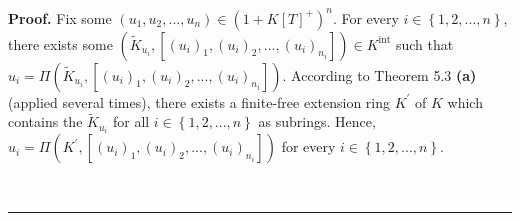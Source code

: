 \documentclass[numbers=enddot,12pt,final,onecolumn,notitlepage]{scrartcl}%
\newenvironment{proof}[1][Proof]{\noindent\textbf{#1.} }{\ \rule{0.5em}{0.5em}}
\begin{document}
\begin{proof}
Fix some $\left(  u_{1},u_{2},...,u_{n}\right)  \in\left(  1+K\left[
T\right]  ^{+}\right)  ^{n}$. For every $i\in\left\{  1,2,...,n\right\}  $,
there exists some $\left(  \widetilde{K}_{u_{i}},\left[  \left(  u_{i}\right)
_{1},\left(  u_{i}\right)  _{2},...,\left(  u_{i}\right)  _{n_{i}}\right]
\right)  \in K^{\operatorname*{int}}$ such that $u_{i}=\Pi\left(
\widetilde{K}_{u_{i}},\left[  \left(  u_{i}\right)  _{1},\left(  u_{i}\right)
_{2},...,\left(  u_{i}\right)  _{n_{i}}\right]  \right)  $. According to
Theorem 5.3 \textbf{(a)} (applied several times), there exists a finite-free
extension ring $K^{\prime}$ of $K$ which contains the $\widetilde{K}_{u_{i}}$
for all $i\in\left\{  1,2,...,n\right\}  $ as subrings. Hence, $u_{i}%
=\Pi\left(  K^{\prime},\left[  \left(  u_{i}\right)  _{1},\left(
u_{i}\right)  _{2},...,\left(  u_{i}\right)  _{n_{i}}\right]  \right)  $ for
every $i\in\left\{  1,2,...,n\right\}  $.


\end{proof}
\end{document}
